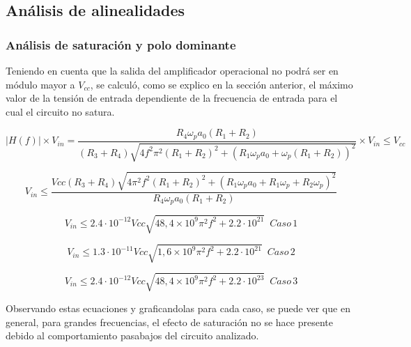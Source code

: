\subsection{Análisis de alinealidades}

\subsubsection{Análisis de saturación y polo dominante}

Teniendo en cuenta que la salida del amplificador operacional no podrá
ser en módulo mayor a $V_{cc}$, se calculó, como se explico en la
sección anterior, el máximo valor de la tensión de entrada dependiente
de la frecuencia de entrada para el cual el circuito no satura.

\[
\left|H(f)\right|\times V_{in}=\frac{R_{4}\omega_{p}a_{0}\left(R_{1}+R_{2}\right)}{\left(R_{3}+R_{4}\right)\sqrt{4f^{2}\pi^{2}\left(R_{1}+R_{2}\right)^{2}+\left(R_{1}\omega_{p}a_{0}+\omega_{p}\left(R_{1}+R_{2}\right)\right)^{2}}}\times V_{in}\leq V_{cc}
\]

\[
V_{in}\leq\frac{Vcc\left(R_{3}+R_{4}\right)\sqrt{4\pi^{2}f^{2}\left(R_{1}+R_{2}\right)^{2}+\left(R_{1}\omega_{p}a_{0}+R_{1}\omega_{p}+R_{2}\omega_{p}\right)^{2}}}{R_{4}\omega_{p}a_{0}\left(R_{1}+R_{2}\right)}
\]

\[
V_{in}\leq2.4\cdot10^{-12}Vcc\sqrt{48,4\times10^{9}\pi^{2}f^{2}+2.2\cdot10^{21}}\,\,\,Caso\,1
\]

\[
V_{in}\leq1.3\cdot10^{-11}Vcc\sqrt{1,6\times10^{9}\pi^{2}f^{2}+2.2\cdot10^{21}}\,\,\,Caso\,2
\]

\[
V_{in}\leq2.4\cdot10^{-12}Vcc\sqrt{48,4\times10^{9}\pi^{2}f^{2}+2.2\cdot10^{23}}\,\,\,Caso\,3
\]

Observando estas ecuaciones y graficandolas para cada caso, se puede
ver que en general, para grandes frecuencias, el efecto de saturación
no se hace presente debido al comportamiento pasabajos del circuito
analizado.

